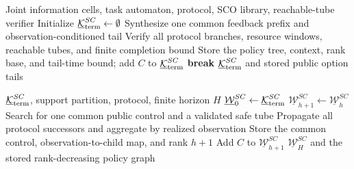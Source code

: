 \documentclass[letterpaper]{article} %
\begin{document}
\begin{algorithm}[t]
\footnotesize
\caption{Offline task-continuation terminal-set synthesis}
\label{alg:terminal-sc}
\begin{algorithmic}[1]
\Require Joint information cells, task automaton, protocol, SCO library, reachable-tube verifier
\State Initialize $\underline{\mathcal K}_{\rm term}^{SC}\gets\emptyset$
    \State Synthesize one common feedback prefix and observation-conditioned tail
    \State Verify all protocol branches, resource windows, reachable tubes, and finite completion bound
      \State Store the policy tree, context, rank base, and tail-time bound; add $C$ to $\underline{\mathcal K}_{\rm term}^{SC}$
      \State \textbf{break}
    \EndIf
  \EndFor
\EndFor
\State \Return $\underline{\mathcal K}_{\rm term}^{SC}$ and stored public option tails
\end{algorithmic}
\end{algorithm}

\begin{algorithm}[t]
\footnotesize
\caption{Finite inner approximation of goal-conditioned information-state viability}
\label{alg:sc-winning}
\begin{algorithmic}[1]
\Require $\underline{\mathcal K}_{\rm term}^{SC}$, support partition, protocol, finite horizon $H$
\State $\underline{\mathcal W}_0^{SC}\gets\underline{\mathcal K}_{\rm term}^{SC}$
  \State $\underline{\mathcal W}_{h+1}^{SC}\gets\underline{\mathcal W}_h^{SC}$
    \State Search for one common public control and a validated safe tube
    \State Propagate all protocol successors and aggregate by realized observation
      \State Store the common control, observation-to-child map, and rank $h+1$
      \State Add $C$ to $\underline{\mathcal W}_{h+1}^{SC}$
    \EndIf
  \EndFor
\EndFor
\State \Return $\underline{\mathcal W}_H^{SC}$ and the stored rank-decreasing policy graph
\end{algorithmic}
\end{algorithm}
\end{document}

